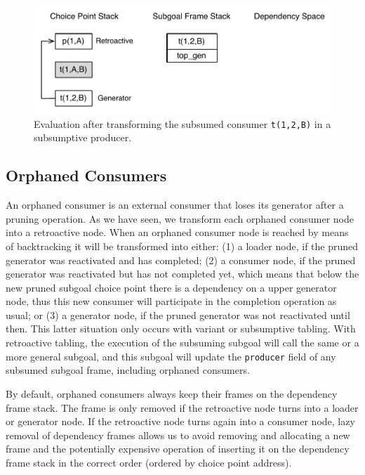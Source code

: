 \begin{figure}[ht]
  \centering
    \includegraphics[scale=0.5]{retro_sub4.pdf}
  \caption{Evaluation after transforming the subsumed consumer \texttt{t(1,2,B)} in a subsumptive producer.}
  \label{fig:retro_sub4}
\end{figure}

\subsection{Orphaned Consumers}

An orphaned consumer is an external consumer that loses its generator after a pruning operation.
As we have seen, we transform each orphaned consumer node into a retroactive node.
When an orphaned consumer node is reached by means of backtracking it will be transformed into either:
(1) a loader node, if the pruned generator was reactivated and has completed; (2) a consumer node,
if the pruned generator was reactivated but has not completed yet, which means that below the new pruned subgoal
choice point there is a dependency on a upper generator node, thus this new consumer will participate
in the completion operation as usual; or (3) a generator node,
if the pruned generator was not reactivated until then. This latter situation only occurs with
variant or subsumptive tabling. With retroactive tabling, the execution of the subsuming subgoal
will call the same or a more general subgoal, and this subgoal will update the \texttt{producer} field
of any subsumed subgoal frame, including orphaned consumers.

By default, orphaned consumers always keep their frames on the dependency frame stack. The frame is only
removed if the retroactive node turns into a loader or generator node. If the retroactive node turns again
into a consumer node, lazy removal of dependency frames allows us to avoid removing and allocating a new
frame and the potentially expensive operation of inserting it on the dependency frame stack in the
correct order (ordered by choice point address).

